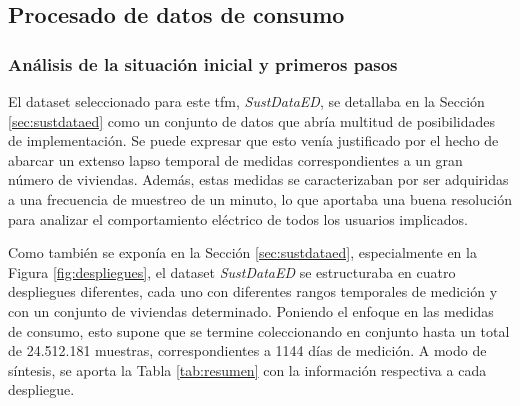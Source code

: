 \subsection{Procesado de datos de consumo}

\subsubsection{Análisis de la situación inicial y primeros pasos}
\label{sec:inicialproc}

El dataset seleccionado para este \gls{tfm}, \textit{SustDataED}, se detallaba en la Sección \ref{sec:sustdataed} como un conjunto de datos que abría multitud de posibilidades de implementación. Se puede expresar que esto venía justificado por el hecho de abarcar un extenso lapso temporal de medidas correspondientes a un gran número de viviendas. Además, estas medidas se caracterizaban por ser adquiridas a una frecuencia de muestreo de un minuto, lo que aportaba una buena resolución para analizar el comportamiento eléctrico de todos los usuarios implicados. 

\vspace{3mm}

Como también se exponía en la Sección \ref{sec:sustdataed}, especialmente en la Figura \ref{fig:despliegues}, el dataset \textit{SustDataED} se estructuraba en cuatro despliegues diferentes, cada uno con diferentes rangos temporales de medición y con un conjunto de viviendas determinado. Poniendo el enfoque en las medidas de consumo, esto supone que se termine coleccionando en conjunto hasta un total de 24.512.181 muestras, correspondientes a 1144 días de medición. A modo de síntesis, se aporta la Tabla \ref{tab:resumen} con la información respectiva a cada despliegue. \cite{sustdata}

\vspace{3mm}

